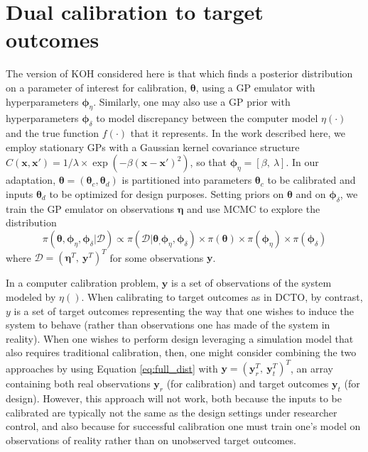 \documentclass[twocolumn,10pt]{asme2ej}
\begin{document}
\section{Dual calibration to target outcomes}\label{sec:dcto}
%
The version of KOH considered here is that which finds a posterior distribution on a parameter of interest for calibration, $\boldsymbol\theta$, using a GP emulator with hyperparameters ${\boldsymbol\phi_\eta}$.
%
Similarly, one may also use a GP prior with hyperparameters $\boldsymbol\phi_\delta$ to model discrepancy between the computer model $\eta(\cdot)$ and the true function $f(\cdot)$ that it represents.
%
In the work described here, we employ stationary GPs with a Gaussian kernel covariance structure $C(\mathbf x,\mathbf x') = 1/\lambda \times \exp(-\beta(\mathbf x-\mathbf x')^2)$, so that ${\boldsymbol\phi_\eta} = \left[\beta,\ \lambda\right]$.
%
In our adaptation, $\boldsymbol\theta=(\boldsymbol\theta_c,\boldsymbol\theta_d)$ is partitioned into parameters $\boldsymbol\theta_c$ to be calibrated and inputs $\boldsymbol\theta_d$ to be optimized for design purposes.
%
Setting priors on $\boldsymbol\theta$ and on $\boldsymbol \phi_\delta$, we train the GP emulator on observations $\boldsymbol \eta$ and use MCMC to explore the distribution
\begin{equation} \label{eq:full_dist}
\pi(\boldsymbol \theta,{\boldsymbol\phi_\eta},\boldsymbol \phi_\delta|\mathcal D)
\propto \pi(\mathcal D | \boldsymbol \theta_,{\boldsymbol\phi_\eta}, \boldsymbol\phi_\delta) %
\times \pi(\boldsymbol\theta)
\times \pi(\boldsymbol\phi_\eta)
\times \pi(\boldsymbol\phi_\delta)
\end{equation}
%
where $\mathcal D = (\boldsymbol\eta^T,\ \mathbf y^T)^T$ for some observations $\mathbf y$.
%

%
In a computer calibration problem, $\mathbf y$ is a set of observations of the system modeled by $\eta()$.
%
When calibrating to target outcomes as in DCTO, by contrast, $y$ is a set of target outcomes representing the way that one wishes to induce the system to behave (rather than observations one has made of the system in reality).
%
When one wishes to perform design leveraging a simulation model that also requires traditional calibration, then, one might consider combining the two approaches by using Equation \eqref{eq:full_dist} with $\mathbf y= (\mathbf y_r^T,\ \mathbf y_t^T)^T$, an array containing both real observations $\mathbf y_r$ (for calibration) and target outcomes $\mathbf y_t$ (for design).
%
However, this approach will not work, both because the inputs to be calibrated are typically not the same as the design settings under researcher control, and also because for successful calibration one must train one's model on observations of reality rather than on unobserved target outcomes.
%
\end{document}
